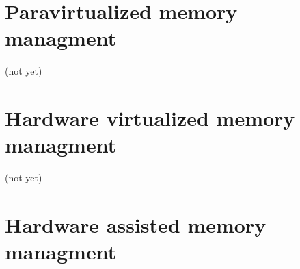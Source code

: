 \section{Paravirtualized memory managment}
\label{memory/paravirt}
(not yet)

\section{Hardware virtualized memory managment}
\label{memory/hvm}
(not yet)

\section{Hardware assisted memory managment}

